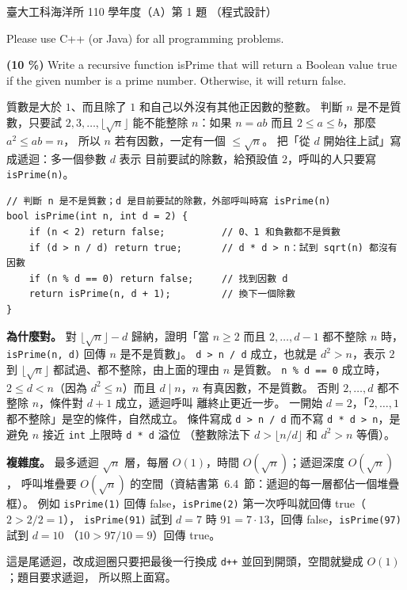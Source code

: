 \begin{pastexam}[label={px:ntu-110-esoe-ds-01}]{臺大工科海洋所 110 學年度（A）第 1 題}
（程式設計）

Please use C++ (or Java) for all programming problems.

\textbf{(10 \%)} Write a recursive function \textsf{isPrime} that will return a Boolean value
\textsf{true} if the given number is a prime number. Otherwise, it will return false.
\end{pastexam}

\begin{pastsoln}
質數是大於 $1$、而且除了 $1$ 和自己以外沒有其他正因數的整數。 判斷 $n$ 是不是質數，只要試 $2, 3,
\ldots, \lfloor\sqrt{n}\rfloor$ 能不能整除 $n$：如果 $n = ab$ 而且 $2 \le a \le b$，那麼 $a^2 \le ab = n$，
所以 $n$ 若有因數，一定有一個 $\le \sqrt{n}$。 把「從 $d$ 開始往上試」寫成遞迴：多一個參數 $d$ 表示
目前要試的除數，給預設值 $2$，呼叫的人只要寫 \texttt{isPrime(n)}。
\begin{verbatim}
// 判斷 n 是不是質數；d 是目前要試的除數，外部呼叫時寫 isPrime(n)
bool isPrime(int n, int d = 2) {
    if (n < 2) return false;          // 0、1 和負數都不是質數
    if (d > n / d) return true;       // d * d > n：試到 sqrt(n) 都沒有因數
    if (n % d == 0) return false;     // 找到因數 d
    return isPrime(n, d + 1);         // 換下一個除數
}
\end{verbatim}

\textbf{為什麼對。} 對 $\lfloor\sqrt{n}\rfloor - d$ 歸納，證明「當 $n \ge 2$ 而且 $2, \ldots, d - 1$ 都不整除
$n$ 時，\texttt{isPrime(n, d)} 回傳 $n$ 是不是質數」。 \texttt{d > n / d} 成立，也就是 $d^2 > n$，表示 $2$ 到 $\lfloor\sqrt{n}
\rfloor$ 都試過、都不整除，由上面的理由 $n$ 是質數。 \texttt{n \% d == 0} 成立時，$2 \le d < n$（因為 $d^2 \le n$）而且
$d \mid n$，$n$ 有真因數，不是質數。 否則 $2, \ldots, d$ 都不整除 $n$，條件對 $d + 1$ 成立，遞迴呼叫
離終止更近一步。 一開始 $d = 2$，「$2, \ldots, 1$ 都不整除」是空的條件，自然成立。 條件寫成
\texttt{d > n / d} 而不寫 \texttt{d * d > n}，是避免 $n$ 接近 \texttt{int} 上限時 \texttt{d * d} 溢位
（整數除法下 $d > \lfloor n/d \rfloor$ 和 $d^2 > n$ 等價）。

\textbf{複雜度。} 最多遞迴 $\sqrt{n}$ 層，每層 $O(1)$，時間 $O(\sqrt{n})$；遞迴深度 $O(\sqrt{n})$，
呼叫堆疊要 $O(\sqrt{n})$ 的空間（資結書第~6.4~節：遞迴的每一層都佔一個堆疊框）。 例如
\texttt{isPrime(1)} 回傳 false，\texttt{isPrime(2)} 第一次呼叫就回傳 true（$2 > 2/2 = 1$），
\texttt{isPrime(91)} 試到 $d = 7$ 時 $91 = 7 \cdot 13$，回傳 false，\texttt{isPrime(97)} 試到 $d = 10$
（$10 > 97/10 = 9$）回傳 true。

這是尾遞迴，改成迴圈只要把最後一行換成 \texttt{d++} 並回到開頭，空間就變成 $O(1)$；題目要求遞迴，
所以照上面寫。
\end{pastsoln}
